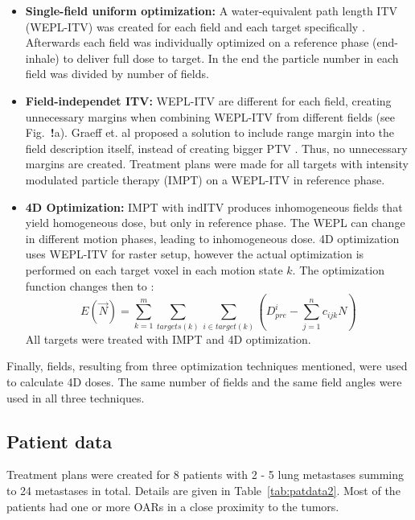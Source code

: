 \documentclass[type=dr, dr=rernat, accentcolor=tud7b,colorbacktitle, bigchapter, openright, twoside, 12pt ]{tudthesis}
\begin{document}
\begin{itemize}
\item \textbf{Single-field uniform optimization:} A water-equivalent path length ITV (WEPL-ITV) was created for each field and each target specifically \cite{Rietzel2012}. Afterwards each field was individually optimized on a reference phase (end-inhale) to deliver full dose to target. In the end the particle number in each field was divided by number of fields.

\item \textbf{Field-independet ITV:} WEPL-ITV are different for each field, creating unnecessary margins when combining WEPL-ITV from different fields (see Fig.~\textbf{!}a). Graeff et. al proposed a solution to include range margin into the field description itself, instead of creating bigger PTV \cite{Graeff2012}. Thus, no unnecessary margins are created. Treatment plans were made for all targets with intensity modulated particle therapy (IMPT) on a WEPL-ITV in reference phase.

\item \textbf{4D Optimization:} IMPT with indITV produces inhomogeneous fields that yield homogeneous dose, but only in reference phase. The WEPL can change in different motion phases, leading to inhomogeneous dose. 4D optimization uses WEPL-ITV for raster setup, however the actual optimization is performed on each target voxel in each motion state $k$. The optimization function changes then to \cite{Graeff2012}:
\begin{equation}
\label{eq-multiCost}
E(\vec{N}) = \sum_{k=1}^{m}\sum_{targets(k)} \sum_{i\in target(k)} \left( D_{pre}^{i} -\sum_{j=1}^n c_{ijk}N\right)
\end{equation}
All targets were treated with IMPT and 4D optimization. 


\end{itemize}

Finally, fields, resulting from three optimization techniques mentioned, were used to calculate 4D doses. The same number of fields and the same field angles were used in all three techniques.

\subsection{Patient data}

Treatment plans were created for 8 patients with 2 - 5 lung metastases summing to 24 metastases in total. Details are given in Table~\ref{tab:patdata2}.
Most of the patients had one or more OARs in a close proximity to the tumors. 
\end{document}
